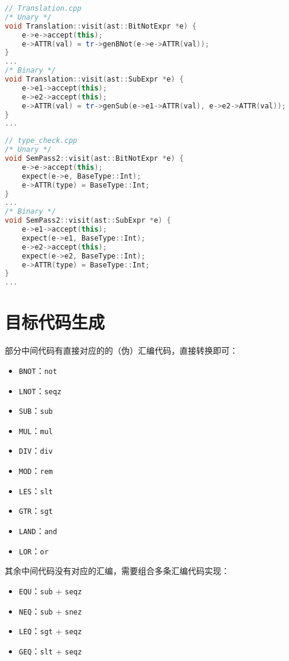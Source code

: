 \documentclass[a4paper]{article}
\begin{document}
\begin{lstlisting}[language=c++]
// Translation.cpp
/* Unary */
void Translation::visit(ast::BitNotExpr *e) {
    e->e->accept(this);
    e->ATTR(val) = tr->genBNot(e->e->ATTR(val));
}
...
/* Binary */
void Translation::visit(ast::SubExpr *e) {
    e->e1->accept(this);
    e->e2->accept(this);
    e->ATTR(val) = tr->genSub(e->e1->ATTR(val), e->e2->ATTR(val));
}
...
\end{lstlisting}

\begin{lstlisting}[language=c++]
// type_check.cpp
/* Unary */
void SemPass2::visit(ast::BitNotExpr *e) {
    e->e->accept(this);
    expect(e->e, BaseType::Int);
    e->ATTR(type) = BaseType::Int;
}
...
/* Binary */
void SemPass2::visit(ast::SubExpr *e) {
    e->e1->accept(this);
    expect(e->e1, BaseType::Int);
    e->e2->accept(this);
    expect(e->e2, BaseType::Int);
    e->ATTR(type) = BaseType::Int;
}
...
\end{lstlisting}

\section{目标代码生成}

部分中间代码有直接对应的的（伪）汇编代码，直接转换即可：

\begin{itemize}
    \item \texttt{BNOT}：\texttt{not}
    \item \texttt{LNOT}：\texttt{seqz}
    \item \texttt{SUB}：\texttt{sub}
    \item \texttt{MUL}：\texttt{mul}
    \item \texttt{DIV}：\texttt{div}
    \item \texttt{MOD}：\texttt{rem}
    \item \texttt{LES}：\texttt{slt}
    \item \texttt{GTR}：\texttt{sgt}
    \item \texttt{LAND}：\texttt{and}
    \item \texttt{LOR}：\texttt{or}
\end{itemize}

其余中间代码没有对应的汇编，需要组合多条汇编代码实现：

\begin{itemize}
    \item \texttt{EQU}：\texttt{sub} + \texttt{seqz}
    \item \texttt{NEQ}：\texttt{sub} + \texttt{snez}
    \item \texttt{LEQ}：\texttt{sgt} + \texttt{seqz}
    \item \texttt{GEQ}：\texttt{slt} + \texttt{seqz}
\end{itemize}
\end{document}
